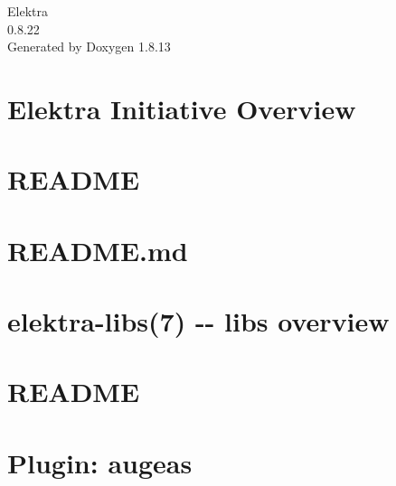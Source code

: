 \documentclass[twoside]{book}
\newcommand{\+}{\discretionary{\mbox{\scriptsize$\hookleftarrow$}}{}{}}
\newcommand{\clearemptydoublepage}{%
  \newpage{\pagestyle{empty}\cleardoublepage}%
}
\begin{document}
\hypersetup{pageanchor=false,
             bookmarksnumbered=true,
             pdfencoding=unicode
            }
\begin{titlepage}
\vspace*{7cm}
\begin{center}%
{\Large Elektra \\[1ex]\large 0.\+8.\+22 }\\
\vspace*{1cm}
{\large Generated by Doxygen 1.8.13}\\
\end{center}
\end{titlepage}
\clearemptydoublepage
{}
\tableofcontents
\clearemptydoublepage
{}
\hypersetup{pageanchor=true}

\chapter{Elektra Initiative Overview}
\label{index}\hypertarget{index}{}
\chapter{R\+E\+A\+D\+ME}
\label{md_src_libs_elektra_README}

\chapter{R\+E\+A\+D\+M\+E.\+md}
\label{src_libs_getenv_README_md}

\chapter{elektra-\/libs(7) -\/-\/ libs overview}
\label{md_src_libs_README}

\chapter{R\+E\+A\+D\+ME}
\label{md_src_bindings_io_doc_README}

\chapter{Plugin\+: augeas}
\label{md_src_plugins_augeas_README}

\end{document}
